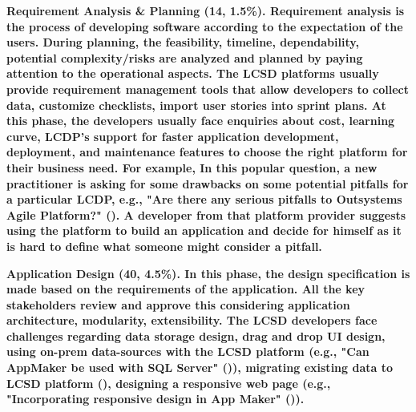 \bf{Requirement Analysis \& Planning (14, 1.5\%).} 
Requirement analysis is the process of developing software according to the expectation of the users. 
During planning, the feasibility, timeline, dependability, potential complexity/risks are analyzed and planned by paying attention to the operational aspects. The LCSD platforms usually provide requirement management tools that allow developers to collect data, customize checklists, import user stories into sprint plans. At this phase, the developers usually face enquiries about cost, learning curve, LCDP's support for faster application development, deployment, and maintenance features to choose the right platform for their business need. For example, In this popular question, a new practitioner is asking for some drawbacks on some potential pitfalls for a particular LCDP, e.g., "Are there any serious pitfalls to Outsystems Agile Platform?" (). A developer from that platform provider suggests using the platform to build an application and decide for himself as it is hard to define what someone might consider a pitfall. 







\bf{Application Design (40, 4.5\%).} In this phase, the design specification is made based on the requirements of the application. All the key stakeholders review and approve this considering application architecture, modularity, extensibility. The LCSD developers face challenges regarding data storage design, drag and drop UI design, using on-prem data-sources with the LCSD platform (e.g., "Can AppMaker be used with SQL Server" ()), migrating existing data to LCSD platform (), designing a responsive web page (e.g., "Incorporating responsive design in App Maker" ()).

